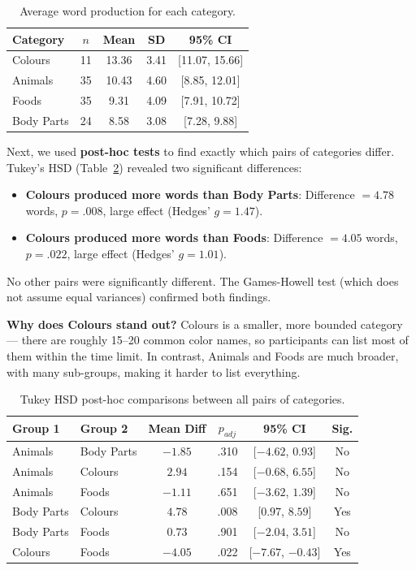 \documentclass[12pt, a4paper]{article}
\begin{document}
\begin{table}[H]
\centering
\caption{Average word production for each category.}
\label{tab:domain_descriptives}
\begin{tabular}{lcccc}
\toprule
\textbf{Category} & \textbf{$n$} & \textbf{Mean} & \textbf{SD} & \textbf{95\% CI} \\
\midrule
Colours & 11 & 13.36 & 3.41 & [11.07, 15.66] \\
Animals & 35 & 10.43 & 4.60 & [8.85, 12.01] \\
Foods & 35 & 9.31 & 4.09 & [7.91, 10.72] \\
Body Parts & 24 & 8.58 & 3.08 & [7.28, 9.88] \\
\bottomrule
\end{tabular}
\end{table}

Next, we used \textbf{post-hoc tests} to find exactly which pairs of categories differ. Tukey's HSD (Table~\ref{tab:tukey}) revealed two significant differences:
\begin{itemize}[nosep]
    \item \textbf{Colours produced more words than Body Parts}: Difference $= 4.78$ words, $p = .008$, large effect (Hedges' $g = 1.47$).
    \item \textbf{Colours produced more words than Foods}: Difference $= 4.05$ words, $p = .022$, large effect (Hedges' $g = 1.01$).
\end{itemize}

No other pairs were significantly different. The Games-Howell test (which does not assume equal variances) confirmed both findings.

\textbf{Why does Colours stand out?} Colours is a smaller, more bounded category --- there are roughly 15--20 common color names, so participants can list most of them within the time limit. In contrast, Animals and Foods are much broader, with many sub-groups, making it harder to list everything.

\begin{table}[H]
\centering
\caption{Tukey HSD post-hoc comparisons between all pairs of categories.}
\label{tab:tukey}
\begin{tabular}{llcccc}
\toprule
\textbf{Group 1} & \textbf{Group 2} & \textbf{Mean Diff} & \textbf{$p_{adj}$} & \textbf{95\% CI} & \textbf{Sig.} \\
\midrule
Animals & Body Parts & $-1.85$ & .310 & [$-4.62$, $0.93$] & No \\
Animals & Colours & $2.94$ & .154 & [$-0.68$, $6.55$] & No \\
Animals & Foods & $-1.11$ & .651 & [$-3.62$, $1.39$] & No \\
Body Parts & Colours & $4.78$ & .008 & [$0.97$, $8.59$] & Yes \\
Body Parts & Foods & $0.73$ & .901 & [$-2.04$, $3.51$] & No \\
Colours & Foods & $-4.05$ & .022 & [$-7.67$, $-0.43$] & Yes \\
\bottomrule
\end{tabular}
\end{table}
\end{document}
